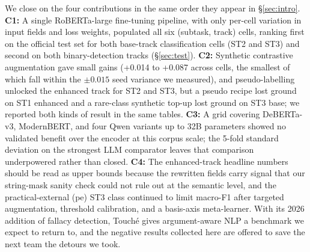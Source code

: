 We close on the four contributions in the same order they appear in \S\ref{sec:intro}. \textbf{C1:} A single RoBERTa-large fine-tuning pipeline, with only per-cell variation in input fields and loss weights, populated all six (subtask, track) cells, ranking first on the official test set for both base-track classification cells (ST2 and ST3) and second on both binary-detection tracks (\S\ref{sec:test}). \textbf{C2:} Synthetic contrastive augmentation gave small gains (+0.014 to +0.087 across cells, the smallest of which fall within the $\pm 0.015$ seed variance we measured), and pseudo-labelling unlocked the enhanced track for ST2 and ST3, but a pseudo recipe lost ground on ST1 enhanced and a rare-class synthetic top-up lost ground on ST3 base; we reported both kinds of result in the same tables. \textbf{C3:} A grid covering DeBERTa-v3, ModernBERT, and four Qwen variants up to 32B parameters showed no validated benefit over the encoder at this corpus scale; the 5-fold standard deviation on the strongest LLM comparator leaves that comparison underpowered rather than closed. \textbf{C4:} The enhanced-track headline numbers should be read as upper bounds because the rewritten fields carry signal that our string-mask sanity check could not rule out at the semantic level, and the practical-external (\textsf{pe}) ST3 class continued to limit macro-F1 after targeted augmentation, threshold calibration, and a basis-axis meta-learner. With its 2026 addition of fallacy detection, Touch\'{e} gives argument-aware NLP a benchmark we expect to return to, and the negative results collected here are offered to save the next team the detours we took.
